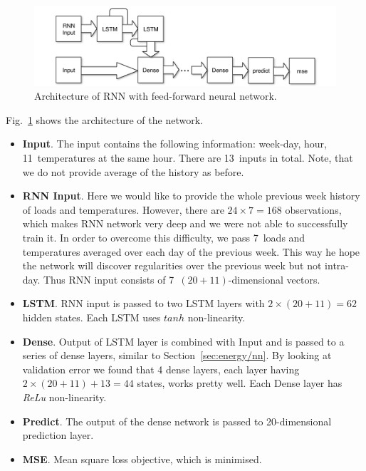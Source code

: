 \documentclass{article} %
\begin{document}
\begin{figure}[h]
\begin{center}
\includegraphics[width=1\linewidth]{energy_RNN_diag.pdf}	
\end{center}
\caption{Architecture of RNN with feed-forward neural network.}
\label{fig:energy/rnn_diag}
\end{figure}
Fig.~\ref{fig:energy/rnn_diag} shows the architecture of the network.
\begin{itemize}
	\item {\bf Input}.
	The input contains the following information: week-day, hour, 11~temperatures
	at the same hour. There are 13~inputs in total. Note, that we do not provide
	average of the history as before.
	\item {\bf RNN Input}.
	Here we would like to provide the whole previous week history of 
	loads and temperatures. However, there are $24\times7=168$ observations,
	which makes RNN network very deep and we were not able to successfully
	train it. In order to overcome this difficulty, we pass 7~loads and 
	temperatures averaged over each day of the previous week. 
	This way he hope the network will discover regularities over the previous
	week but not intra-day.
	Thus 
	RNN input consists of
	7~$(20+11)$-dimensional vectors.
	\item {\bf LSTM}. RNN input is passed to two LSTM layers with 
	$2\times(20+11)=62$ hidden states. Each LSTM uses $tanh$ non-linearity.
	\item {\bf Dense}. 
	Output of LSTM layer is combined with Input and is passed to a series of dense
	layers, similar to Section~\ref{sec:energy/nn}. 
	By looking at validation error we found that 4 dense layers,
	each layer having $2\times(20+11)+13=44$ states,
	works pretty well. Each Dense layer has {\it ReLu} non-linearity.
	\item {\bf Predict}.
	The output of the dense network is passed to 20-dimensional 
	prediction layer.
	\item {\bf MSE}.
	Mean square loss objective, which is minimised. 
\end{itemize}
\end{document}

